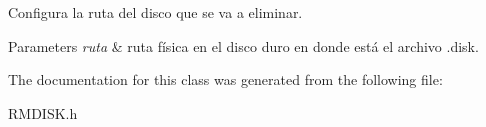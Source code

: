 Configura la ruta del disco que se va a eliminar. 
\begin{DoxyParams}{Parameters}
{\em ruta} & ruta física en el disco duro en donde está el archivo .disk. \\
\hline
\end{DoxyParams}


The documentation for this class was generated from the following file\+:\begin{DoxyCompactItemize}
\item 
R\+M\+D\+I\+S\+K.\+h\end{DoxyCompactItemize}
